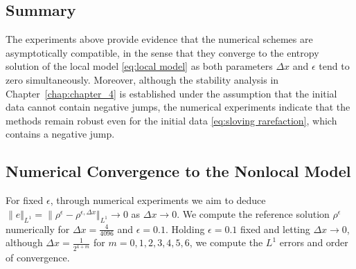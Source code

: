 \subsection*{Summary}
The experiments above provide evidence that the numerical schemes are asymptotically compatible, in the sense that they converge to the entropy solution of the local model \eqref{eq:local model} as both parameters $\Delta x$ and $\epsilon$ tend to zero simultaneously. Moreover, although the stability analysis in Chapter~\ref{chap:chapter_4} is established under the assumption that the initial data cannot contain negative jumps, the numerical experiments indicate that the methods remain robust even for the initial data \eqref{eq:sloving rarefaction}, which contains a negative jump.

\subsection{Numerical Convergence to the Nonlocal Model}

For fixed $\epsilon$, through numerical experiments we aim to deduce $ \| e \Vert_{L^{1}}= \| \rho^{\epsilon} - \rho^{\epsilon, \Delta x}\Vert_{L^{1}} \rightarrow 0$ as $\Delta x \rightarrow 0$. We compute the reference solution $\rho^{\epsilon}$ numerically for $\Delta x = \frac{4}{4096}$ and $\epsilon = 0.1$. Holding $\epsilon = 0.1$ fixed and letting $\Delta x \rightarrow 0$, although $\Delta x = \frac{1}{2^{4+m}}$ for $m = 0,1,2,3, 4, 5, 6$, we compute the $L^{1}$ errors and order of convergence.


